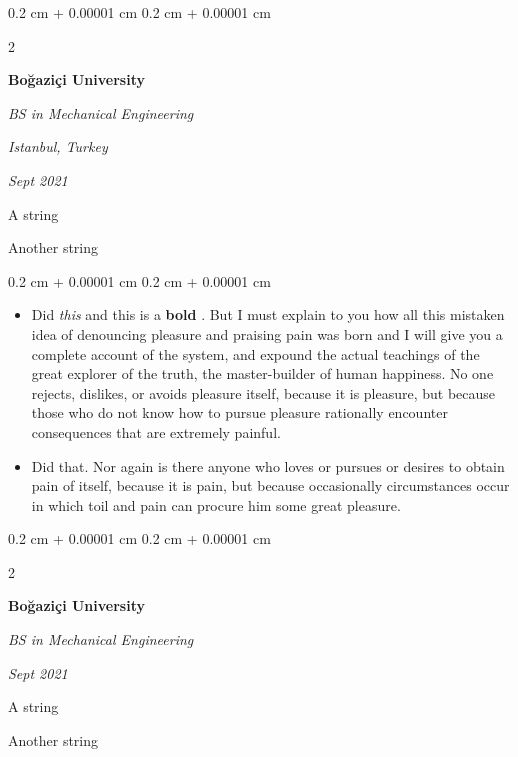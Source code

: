\documentclass[10pt, letterpaper]{article}
\newenvironment{summary}{
    \begin{description}[
        topsep=0.10 cm,
        parsep=0.10 cm,
        partopsep=0pt,
        itemsep=0pt,
        leftmargin=0.4 cm + 10pt
    ]
}{
    \end{description}
} %
\newenvironment{highlights}{
    \begin{itemize}[
        topsep=0.10 cm,
        parsep=0.10 cm,
        partopsep=0pt,
        itemsep=0pt,
        leftmargin=0.4 cm + 10pt
    ]
}{
    \end{itemize}
} %
\newenvironment{onecolentry}{
    \begin{adjustwidth}{
        0.2 cm + 0.00001 cm
    }{
        0.2 cm + 0.00001 cm
    }
}{
    \end{adjustwidth}
} %
\newenvironment{twocolentry}[2][]{
    \onecolentry
    \def\secondColumn{#2}
    \setcolumnwidth{\fill, 4.5 cm}
    \begin{paracol}{2}
}{
    \switchcolumn \raggedleft \secondColumn
    \end{paracol}
    \endonecolentry
} %
\let\hrefWithoutArrow\href
\renewcommand{\href}[2]{\hrefWithoutArrow{#1}{\ifthenelse{\equal{#2}{}}{ }{#2 }\raisebox{.15ex}{\footnotesize \faExternalLink*}}}
\begin{document}
        \begin{twocolentry}{
        \textit{Istanbul, Turkey}    
            
        \textit{Sept 2021}}
            \textbf{Boğaziçi University}

            \textit{BS in Mechanical Engineering}
        \end{twocolentry}
            \begin{summary}
                \item A string
                \item Another string
            \end{summary}
        \vspace{0.10 cm}
        \begin{onecolentry}
            \begin{highlights}
                \item Did \textit{this} and this is a \textbf{bold} \href{https://example.com}{link}. But I must explain to you how all this mistaken idea of denouncing pleasure and praising pain was born and I will give you a complete account of the system, and expound the actual teachings of the great explorer of the truth, the master-builder of human happiness. No one rejects, dislikes, or avoids pleasure itself, because it is pleasure, but because those who do not know how to pursue pleasure rationally encounter consequences that are extremely painful.
                \item Did that. Nor again is there anyone who loves or pursues or desires to obtain pain of itself, because it is pain, but because occasionally circumstances occur in which toil and pain can procure him some great pleasure.
            \end{highlights}
        \end{onecolentry}


        \vspace{0.2 cm}

        \begin{twocolentry}{
            
            
        \textit{Sept 2021}}
            \textbf{Boğaziçi University}

            \textit{BS in Mechanical Engineering}
        \end{twocolentry}
            \begin{summary}
                \item A string
                \item Another string
            \end{summary}
\end{document}
